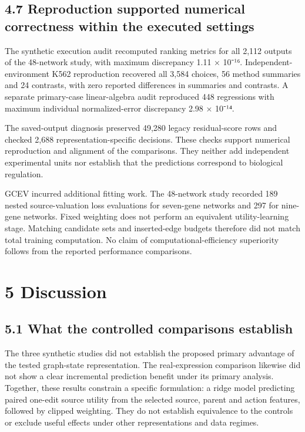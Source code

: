 \documentclass[
  11pt,
]{article}
\begin{document}
\subsection{4.7 Reproduction supported numerical correctness within the
executed
settings}\label{reproduction-supported-numerical-correctness-within-the-executed-settings}

The synthetic execution audit recomputed ranking metrics for all 2,112
outputs of the 48-network study, with maximum discrepancy 1.11 × 10⁻¹⁶.
Independent-environment K562 reproduction recovered all 3,584 choices,
56 method summaries and 24 contrasts, with zero reported differences in
summaries and contrasts. A separate primary-case linear-algebra audit
reproduced 448 regressions with maximum individual normalized-error
discrepancy 2.98 × 10⁻¹⁴.

The saved-output diagnosis preserved 49,280 legacy residual-score rows
and checked 2,688 representation-specific decisions. These checks
support numerical reproduction and alignment of the comparisons. They
neither add independent experimental units nor establish that the
predictions correspond to biological regulation.

GCEV incurred additional fitting work. The 48-network study recorded 189
nested source-valuation loss evaluations for seven-gene networks and 297
for nine-gene networks. Fixed weighting does not perform an equivalent
utility-learning stage. Matching candidate sets and inserted-edge
budgets therefore did not match total training computation. No claim of
computational-efficiency superiority follows from the reported
performance comparisons.

\section{5 Discussion}\label{discussion}

\subsection{5.1 What the controlled comparisons
establish}\label{what-the-controlled-comparisons-establish}

The three synthetic studies did not establish the proposed primary
advantage of the tested graph-state representation. The real-expression
comparison likewise did not show a clear incremental prediction benefit
under its primary analysis. Together, these results constrain a specific
formulation: a ridge model predicting paired one-edit source utility
from the selected source, parent and action features, followed by
clipped weighting. They do not establish equivalence to the controls or
exclude useful effects under other representations and data regimes.
\end{document}
